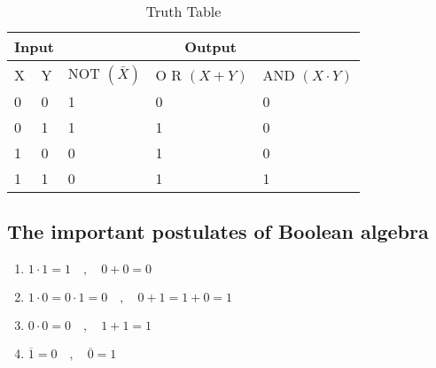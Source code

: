 \begin{table}[H]
	\begin{center}
		\begin{tabular}{|p{2cm}|p{2cm}|p{2cm}|p{2cm}|p{2cm} |}
			\hline
			\multicolumn{2}{|c|}{Input} &\multicolumn{3}{|c|}{Output}\\
			\hline
			X& Y &NOT
			$(\bar{X})$&O R $(X+Y)$&AND $(X  \cdot  Y)$ \\
			\hline
			0&0&1&0&0\\
			0   & 1  & 1  & 1  & 0  \\
			1 &  0  & 0 &  1  &  0 \\
			1 &  1 & 0  &  1 &  1\\
			\hline
		\end{tabular}
	\end{center}
	\caption{Truth Table}
\end{table}


\subsection{The important postulates of Boolean algebra}
\begin{enumerate}
	\item $1 \cdot 1=1\quad ,\quad  0+0=0$
	\item $1 \cdot 0=0 \cdot 1=0 \quad ,\quad 0+1=1+0=1$
	\item $0 \cdot 0=0\quad ,\quad 1+1=1$
	\item $\overline{1}=0 \quad ,\quad  \overline{0}=1$
\end{enumerate}

